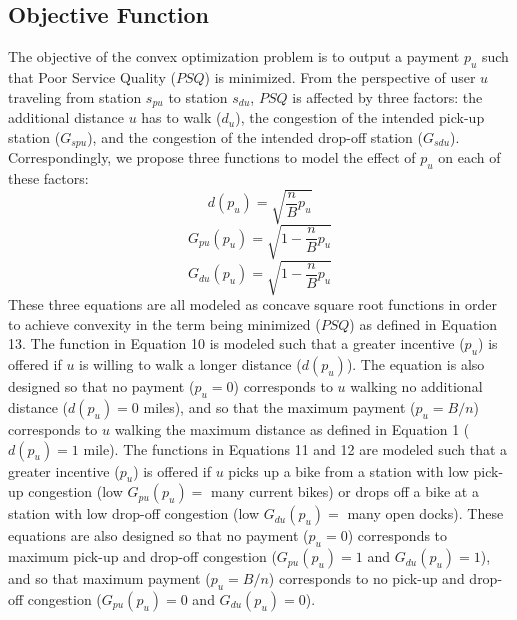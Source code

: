 \documentclass[times, 10pt,twocolumn]{article}
\begin{document}
\subsection{Objective Function}
 
The objective of the convex optimization problem is to output a payment $p_u$ such that Poor Service Quality ($PSQ$) is minimized. From the perspective of user $u$ traveling from station $s_{pu}$ to station $s_{du}$, $PSQ$ is affected by three factors: the additional distance $u$ has to walk ($d_u$), the congestion of the intended pick-up station ($G_{spu}$), and the congestion of the intended drop-off station ($G_{sdu}$). Correspondingly, we propose three functions to model the effect of $p_u$ on each of these factors:
\begin{equation}
d(p_u) = \sqrt{\frac{n}{B}p_u}
\end{equation}
\begin{equation}
G_{pu}(p_u) = \sqrt{1-\frac{n}{B}p_u}
\end{equation}
\begin{equation}
G_{du}(p_u) = \sqrt{1-\frac{n}{B}p_u}
\end{equation}
These three equations are all modeled as concave square root functions in order to achieve convexity in the term being minimized ($PSQ$) as defined in Equation 13. The function in Equation 10 is modeled such that a greater incentive ($p_u$) is offered if $u$ is willing to walk a longer distance ($d(p_u)$). The equation is also designed so that no payment ($p_u = 0$) corresponds to $u$ walking no additional distance ($d(p_u) = 0$ miles), and so that the maximum payment ($p_u = B/n$) corresponds to $u$ walking the maximum distance as defined in Equation 1 ($d(p_u) = 1$ mile). The functions in Equations 11 and 12 are modeled such that a greater incentive ($p_u$) is offered if $u$ picks up a bike from a station with low pick-up congestion (low $G_{pu}(p_u) =$ many current bikes) or drops off a bike at a station with low drop-off congestion (low $G_{du}(p_u) =$ many open docks). These equations are also designed so that no payment ($p_u = 0$) corresponds to maximum pick-up and drop-off congestion ($G_{pu}(p_u) = 1$ and $G_{du}(p_u) = 1$), and so that maximum payment ($p_u = B/n$) corresponds to no pick-up and drop-off congestion ($G_{pu}(p_u) = 0$ and $G_{du}(p_u) = 0$).
\end{document}
